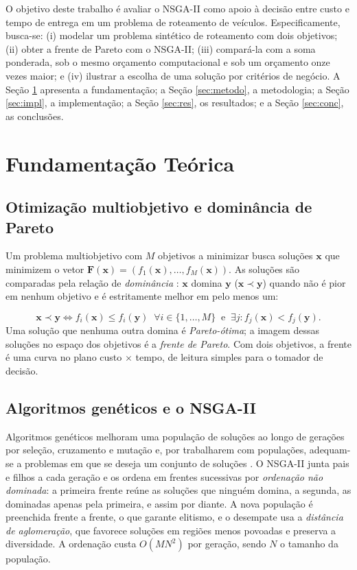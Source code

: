 \documentclass[a4paper,12pt]{article}
\begin{document}
O objetivo deste trabalho é avaliar o NSGA-II como apoio à decisão entre custo e tempo de entrega em um problema de roteamento de veículos. Especificamente, busca-se: (i) modelar um problema sintético de roteamento com dois objetivos; (ii) obter a frente de Pareto com o NSGA-II; (iii) compará-la com a soma ponderada, sob o mesmo orçamento computacional e sob um orçamento onze vezes maior; e (iv) ilustrar a escolha de uma solução por critérios de negócio. A Seção \ref{sec:fund} apresenta a fundamentação; a Seção \ref{sec:metodo}, a metodologia; a Seção \ref{sec:impl}, a implementação; a Seção \ref{sec:res}, os resultados; e a Seção \ref{sec:conc}, as conclusões.


\section{Fundamentação Teórica}\label{sec:fund}

\subsection{Otimização multiobjetivo e dominância de Pareto}\label{sec:pareto}
\noindent Um problema multiobjetivo com $M$ objetivos a minimizar busca soluções $\mathbf{x}$ que minimizem o vetor $\mathbf{F}(\mathbf{x}) = (f_1(\mathbf{x}), \ldots, f_M(\mathbf{x}))$. As soluções são comparadas pela relação de \emph{dominância} \citep{miettinen1999,deb2001}: $\mathbf{x}$ domina $\mathbf{y}$ ($\mathbf{x} \prec \mathbf{y}$) quando não é pior em nenhum objetivo e é estritamente melhor em pelo menos um:

\begin{equation}
\mathbf{x} \prec \mathbf{y} \iff f_i(\mathbf{x}) \le f_i(\mathbf{y})\;\; \forall i \in \{1,\ldots,M\} \;\;\text{e}\;\; \exists j : f_j(\mathbf{x}) < f_j(\mathbf{y}).
\label{eq:dom}
\end{equation}
Uma solução que nenhuma outra domina é \emph{Pareto-ótima}; a imagem dessas soluções no espaço dos objetivos é a \emph{frente de Pareto}. Com dois objetivos, a frente é uma curva no plano custo $\times$ tempo, de leitura simples para o tomador de decisão.


\subsection{Algoritmos genéticos e o NSGA-II}\label{sec:nsga}
\noindent Algoritmos genéticos melhoram uma população de soluções ao longo de gerações por seleção, cruzamento e mutação \citep{holland1975,goldberg1989} e, por trabalharem com populações, adequam-se a problemas em que se deseja um conjunto de soluções \citep{coello2007}. O NSGA-II \citep{deb2002} junta pais e filhos a cada geração e os ordena em frentes sucessivas por \emph{ordenação não dominada}: a primeira frente reúne as soluções que ninguém domina, a segunda, as dominadas apenas pela primeira, e assim por diante. A nova população é preenchida frente a frente, o que garante elitismo, e o desempate usa a \emph{distância de aglomeração}, que favorece soluções em regiões menos povoadas e preserva a diversidade. A ordenação custa $O(MN^2)$ por geração, sendo $N$ o tamanho da população.
\end{document}
